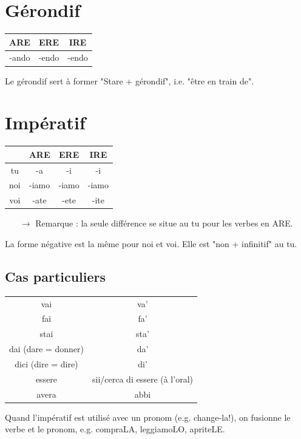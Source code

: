 \documentclass[12pt, openany]{report}
\begin{document}
\section{Gérondif}
\begin{center}
    \begin{tabular}{c|c|c}
        ARE & ERE & IRE\\ \hline 
        -ando & -endo & -endo\\
    \end{tabular}
\end{center}
Le gérondif sert à former "Stare + gérondif", i.e. "être en train de".
\section{Impératif}
\begin{center}
    \begin{tabular}{c|c|c|c}
        & ARE & ERE & IRE\\ \hline
        tu & -a & -i & -i \\
        noi & -iamo & -iamo & -iamo \\
        voi & -ate & -ete & -ite \\
    \end{tabular}
\end{center}
\begin{itemize}
    \item [$\rightarrow$] Remarque : la seule différence se situe au tu pour les verbes en ARE. 
\end{itemize}
La forme négative est la même pour noi et voi. Elle est "non + infinitif" au tu. 
\subsection{Cas particuliers}
\begin{center}
    \begin{tabular}{c|c}
        vai & va'\\
        fai & fa'\\
        stai & sta'\\
        dai (dare = donner) & da'\\
        dici (dire = dire) & di'\\
        essere & sii/cerca di essere (à l'oral)\\
        avera & abbi\\ 
    \end{tabular}
\end{center}
Quand l'impératif est utilisé avec un pronom (e.g. change-la!), on fusionne le verbe et le pronom, e.g. compraLA, leggiamoLO, apriteLE. 
\end{document}
